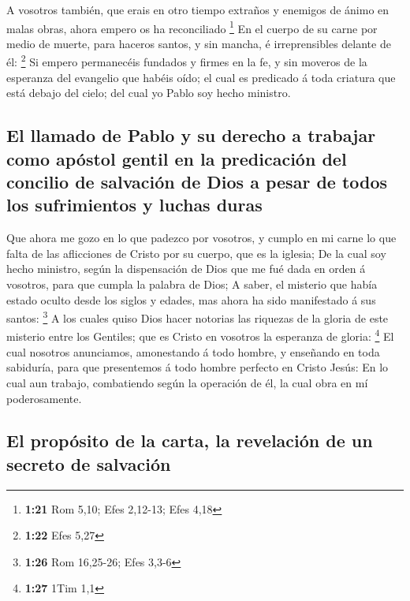  A vosotros también, que erais en otro tiempo extraños y
enemigos de ánimo en malas obras, ahora empero os ha reconciliado
\footnote{\textbf{1:21} Rom 5,10; Efes 2,12-13; Efes 4,18} 
En el cuerpo de su carne por medio de muerte, para haceros santos, y sin
mancha, é irreprensibles delante de él: \footnote{\textbf{1:22} Efes
  5,27}  Si empero permanecéis fundados y firmes en la fe,
y sin moveros de la esperanza del evangelio que habéis oído; el cual es
predicado á toda criatura que está debajo del cielo; del cual yo Pablo
soy hecho ministro.

\hypertarget{el-llamado-de-pablo-y-su-derecho-a-trabajar-como-apuxf3stol-gentil-en-la-predicaciuxf3n-del-concilio-de-salvaciuxf3n-de-dios-a-pesar-de-todos-los-sufrimientos-y-luchas-duras}{%
\subsection{El llamado de Pablo y su derecho a trabajar como apóstol
gentil en la predicación del concilio de salvación de Dios a pesar de
todos los sufrimientos y luchas
duras}\label{el-llamado-de-pablo-y-su-derecho-a-trabajar-como-apuxf3stol-gentil-en-la-predicaciuxf3n-del-concilio-de-salvaciuxf3n-de-dios-a-pesar-de-todos-los-sufrimientos-y-luchas-duras}}

 Que ahora me gozo en lo que padezco por vosotros, y cumplo
en mi carne lo que falta de las aflicciones de Cristo por su cuerpo, que
es la iglesia;  De la cual soy hecho ministro, según la
dispensación de Dios que me fué dada en orden á vosotros, para que
cumpla la palabra de Dios;  A saber, el misterio que había
estado oculto desde los siglos y edades, mas ahora ha sido manifestado á
sus santos: \footnote{\textbf{1:26} Rom 16,25-26; Efes 3,3-6}
 A los cuales quiso Dios hacer notorias las riquezas de la
gloria de este misterio entre los Gentiles; que es Cristo en vosotros la
esperanza de gloria: \footnote{\textbf{1:27} 1Tim 1,1}  El
cual nosotros anunciamos, amonestando á todo hombre, y enseñando en toda
sabiduría, para que presentemos á todo hombre perfecto en Cristo Jesús:
 En lo cual aun trabajo, combatiendo según la operación de
él, la cual obra en mí poderosamente.

\hypertarget{el-propuxf3sito-de-la-carta-la-revelaciuxf3n-de-un-secreto-de-salvaciuxf3n}{%
\subsection{El propósito de la carta, la revelación de un secreto de
salvación}\label{el-propuxf3sito-de-la-carta-la-revelaciuxf3n-de-un-secreto-de-salvaciuxf3n}}

